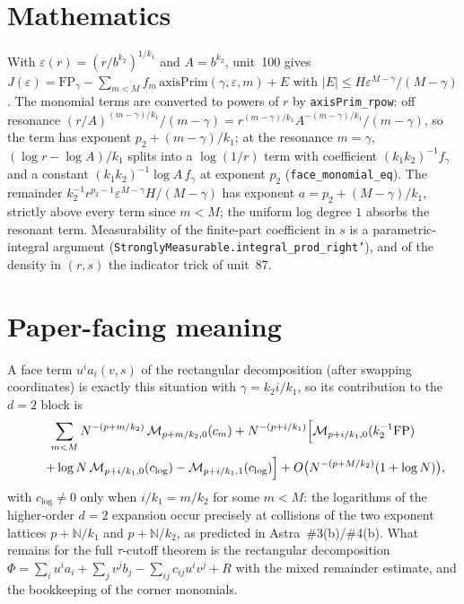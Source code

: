 \documentclass[11pt]{article}
\begin{document}
\section{Mathematics}

With $\varepsilon(r)=(r/b^{k_2})^{1/k_1}$ and $A=b^{k_2}$, unit~100 gives
$J(\varepsilon)=\mathrm{FP}_\gamma-\sum_{m<M}f_m\,\mathrm{axisPrim}(\gamma,\varepsilon,m)+E$ with
$|E|\le H\varepsilon^{M-\gamma}/(M-\gamma)$. The monomial terms are converted to powers of $r$ by
\texttt{axisPrim\_rpow}: off resonance $(r/A)^{(m-\gamma)/k_1}/(m-\gamma)=r^{(m-\gamma)/k_1}A^{-(m-\gamma)/k_1}/(m-\gamma)$,
so the term has exponent $p_2+(m-\gamma)/k_1$; at the resonance $m=\gamma$,
$(\log r-\log A)/k_1$ splits into a $\log(1/r)$ term with coefficient $(k_1k_2)^{-1}f_\gamma$ and a
constant $(k_1k_2)^{-1}\log A\,f_\gamma$ at exponent $p_2$ (\texttt{face\_monomial\_eq}). The
remainder $k_2^{-1}r^{p_2-1}\varepsilon^{M-\gamma}H/(M-\gamma)$ has exponent
$a=p_2+(M-\gamma)/k_1$, strictly above every term since $m<M$; the uniform log degree $1$ absorbs
the resonant term. Measurability of the finite-part coefficient in $s$ is a parametric-integral
argument (\texttt{StronglyMeasurable.integral\_prod\_right'}), and of the density in $(r,s)$ the
indicator trick of unit~87.

\section{Paper-facing meaning}

A face term $u^ia_i(v,s)$ of the rectangular decomposition (after swapping coordinates) is exactly
this situation with $\gamma=k_2i/k_1$, so its contribution to the $d=2$ block is
\begin{gather*}
\sum_{m<M}N^{-(p+m/k_2)}\,\mathcal M_{p+m/k_2,0}(c_m)
+N^{-(p+i/k_1)}\Bigl[\mathcal M_{p+i/k_1,0}(k_2^{-1}\mathrm{FP})\\
\qquad+\log N\,\mathcal M_{p+i/k_1,0}(c_{\log})-\mathcal M_{p+i/k_1,1}(c_{\log})\Bigr]
+O\bigl(N^{-(p+M/k_2)}(1+\log N)\bigr),
\end{gather*}
with $c_{\log}\ne0$ only when $i/k_1=m/k_2$ for some $m<M$: the logarithms of the higher-order
$d=2$ expansion occur precisely at collisions of the two exponent lattices $p+\mathbb N/k_1$ and
$p+\mathbb N/k_2$, as predicted in Astra~\#3(b)/\#4(b). What remains for the full $\tau$-cutoff
theorem is the rectangular decomposition $\Phi=\sum_iu^ia_i+\sum_jv^jb_j-\sum_{ij}c_{ij}u^iv^j+R$
with the mixed remainder estimate, and the bookkeeping of the corner monomials.
\end{document}
